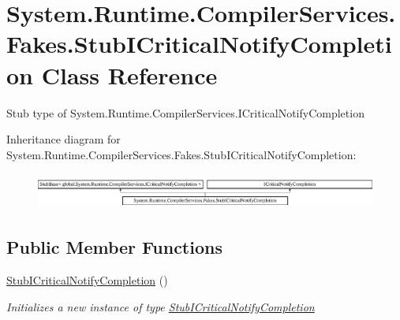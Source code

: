 \hypertarget{class_system_1_1_runtime_1_1_compiler_services_1_1_fakes_1_1_stub_i_critical_notify_completion}{\section{System.\-Runtime.\-Compiler\-Services.\-Fakes.\-Stub\-I\-Critical\-Notify\-Completion Class Reference}
\label{class_system_1_1_runtime_1_1_compiler_services_1_1_fakes_1_1_stub_i_critical_notify_completion}
}


Stub type of System.\-Runtime.\-Compiler\-Services.\-I\-Critical\-Notify\-Completion 


Inheritance diagram for System.\-Runtime.\-Compiler\-Services.\-Fakes.\-Stub\-I\-Critical\-Notify\-Completion\-:\begin{figure}[H]
\begin{center}
\leavevmode
\includegraphics[height=1.194030cm]{class_system_1_1_runtime_1_1_compiler_services_1_1_fakes_1_1_stub_i_critical_notify_completion}
\end{center}
\end{figure}
\subsection*{Public Member Functions}
\begin{DoxyCompactItemize}
\item 
\hyperlink{class_system_1_1_runtime_1_1_compiler_services_1_1_fakes_1_1_stub_i_critical_notify_completion_a69306b11145204adef37a77de89b90cf}{Stub\-I\-Critical\-Notify\-Completion} ()
\begin{DoxyCompactList}\small\item\em Initializes a new instance of type \hyperlink{class_system_1_1_runtime_1_1_compiler_services_1_1_fakes_1_1_stub_i_critical_notify_completion}{Stub\-I\-Critical\-Notify\-Completion}\end{DoxyCompactList}\end{DoxyCompactItemize}
